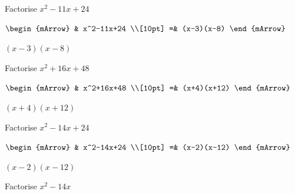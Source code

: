 \begin{mtask}[resume]
   \task \begin{exercise} Factorise $x^2-11x+24$\\
             \begin{envSolution}
			      
			      $\begin{mArrow}
			          & x^2-11x+24                     \\[10pt]    
					 =& (x-3)(x-8) 
				 \end{mArrow}$
                 \begin{shortsolution}  
				       $(x-3)(x-8)$
			     \end{shortsolution}				 
               \end{envSolution}
         \end{exercise}

   \task \begin{exercise} Factorise $x^2+16x+48$\\
             \begin{envSolution}
			      
			      $\begin{mArrow}
			        & x^2+16x+48                   \\[10pt]   
                   =& (x+4)(x+12)    					
				 \end{mArrow}$
                 \begin{shortsolution}  
				       $(x+4)(x+12)$
			     \end{shortsolution}				 
               \end{envSolution}
         \end{exercise}


   \task \begin{exercise} Factorise $x^2-14x+24$\\
             \begin{envSolution}
			      
			      $\begin{mArrow}
			          & x^2-14x+24                      \\[10pt]    
					 =& (x-2)(x-12) 
				 \end{mArrow}$
                 \begin{shortsolution}  
				       $(x-2)(x-12)$
			     \end{shortsolution}				 
               \end{envSolution}
         \end{exercise}
		 
   \task \begin{exercise} Factorise $x^2-14x$\\
             \begin{envSolution}
			      

\end{envSolution}
\end{exercise}
\end{mtask}
